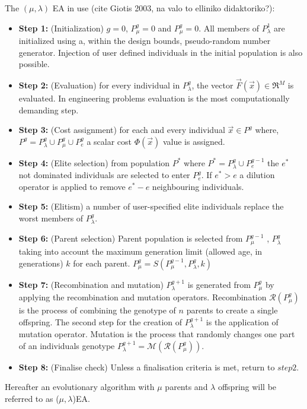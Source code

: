 The $(\mu,\lambda)$ EA in use (cite Giotis 2003, na valo to elliniko didaktoriko?):
\begin{itemize}
\item[]{\bf Step 1:}  (Initialization) $g=0$, $P_{\mu}^g=0$ and $P_{\mu}^g=0$. All members of $P_{\lambda}^1$ are initialized using a, within the design bounds,  pseudo-random number generator. Injection of user defined individuals in the initial population is also possible. 
\item[]{\bf Step 2:}  (Evaluation) for every individual in $P_{\lambda}^g$, the vector $\vec{F}(\vec{x}) \in \Re^{M} $ is evaluated. In engineering problems evaluation is the most computationally demanding step.
\item[]{\bf Step 3:}  (Cost assignment) for each and every individual $\vec{x} \in P^g$ where, $P^g = P_{\lambda}^g \cup P_{\mu}^g \cup P_{e}^g$ a scalar cost $\Phi(\vec{x})$ value is assigned.
\item[]{\bf Step 4:}  (Elite selection) from population $P^*$ where $P^*=P_{\lambda}^g \cup P_{e}^{g-1}$ the $e^*$ not dominated individuals are selected to enter $P_e^g$. If $e^* > e$ a dilution operator is applied to remove $e^* - e$ neighbouring individuals.     
\item[]{\bf Step 5:}  (Elitism) a number of user-specified elite individuals replace the worst members of $P_{\lambda}^g$.  
\item[]{\bf Step 6:}  (Parent selection) Parent population is selected from $P_{\mu}^{g-1}$ , $P_{\lambda}^g$ taking into account the maximum generation limit (allowed age, in generations) $k$ for each parent. $P_{\mu}^{g}=S(P_{\mu}^{g-1},P_{\lambda}^g,k)$ 
\item[]{\bf Step 7:}  (Recombination and mutation) $P_{\lambda}^{g+1}$ is generated from 
$P_{\mu}^{g}$  by applying the recombination and mutation operators. Recombination $\mathcal{R}(P_{\mu}^{g})$ is the process of combining the genotype of $n$ parents to create a single offspring. The second step for the creation of $P_{\lambda}^{g+1}$ is the application of mutation operator. Mutation is the process that randomly changes one part of an individuals genotype $P_{\lambda}^{g+1} = \mathcal{M}(\mathcal{R}(P_{\mu}^{g}))$.
\item[]{\bf Step 8:}  (Finalise check) Unless a finalisation criteria is met, return to $step 2$.
\end{itemize}
Hereafter an evolutionary algorithm with $\mu$ parents and $\lambda$ offspring will be referred to as ($\mu,\lambda$)EA.   

